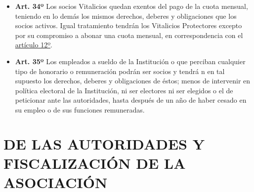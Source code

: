 \documentclass[]{book}
\providecommand{\tightlist}{%
  \setlength{\itemsep}{0pt}\setlength{\parskip}{0pt}}
\begin{document}
\begin{itemize}
\tightlist
\item
  \textbf{Art. 34º} Los socios Vitalicios quedan exentos del pago de la
  cuota mensual, teniendo en lo demás los mismos derechos, deberes y
  obligaciones que los socios activos. Igual tratamiento tendrán los
  Vitalicios Protectores excepto por su compromiso a abonar una cuota
  mensual, en correspondencia con el \protect\hyperlink{art12}{artículo
  12º}.
\end{itemize}

\begin{itemize}
\tightlist
\item
  \textbf{Art. 35º} Los empleados a sueldo de la Institución o que
  perciban cualquier tipo de honorario o remuneración podrán ser socios
  y tendrá n en tal supuesto los derechos, deberes y obligaciones de
  éstos; menos de intervenir en política electoral de la Institución, ni
  ser electores ni ser elegidos o el de peticionar ante las autoridades,
  hasta después de un año de haber cesado en su empleo o de sus
  funciones remuneradas.
\end{itemize}

\chapter{DE LAS AUTORIDADES Y FISCALIZACIÓN DE LA
ASOCIACIÓN}\label{cap5}
\end{document}
